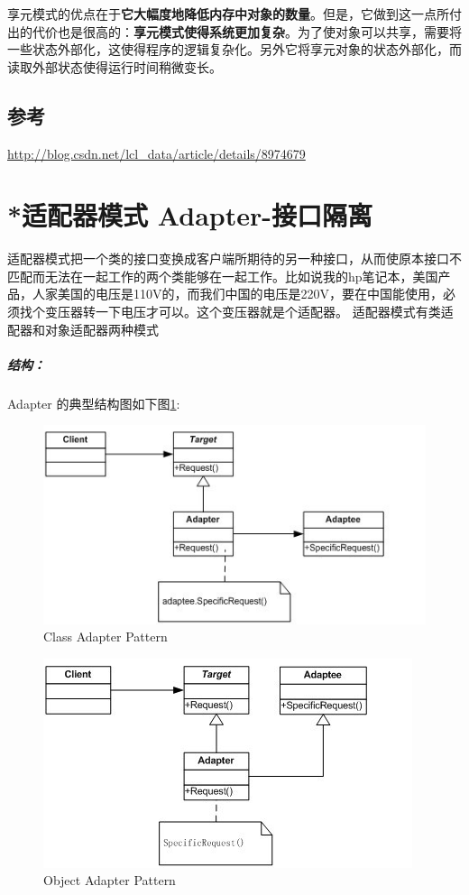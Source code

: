 \documentclass[UTF8,a4paper,12pt]{ctexbook}
\begin{document}
		享元模式的优点在于\textbf{它大幅度地降低内存中对象的数量}。但是，它做到这一点所付出的代价也是很高的：\textbf{享元模式使得系统更加复杂}。为了使对象可以共享，需要将一些状态外部化，这使得程序的逻辑复杂化。另外它将享元对象的状态外部化，而读取外部状态使得运行时间稍微变长。
		
	\subsection{参考}
		\url{http://blog.csdn.net/lcl_data/article/details/8974679}

\newpage
\section{*适配器模式 Adapter-接口隔离}
	适配器模式把一个类的接口变换成客户端所期待的另一种接口，从而使原本接口不匹配而无法在一起工作的两个类能够在一起工作。比如说我的hp笔记本，美国产品，人家美国的电压是110V的，而我们中国的电压是220V，要在中国能使用，必须找个变压器转一下电压才可以。这个变压器就是个适配器。
	适配器模式有类适配器和对象适配器两种模式
	
	\subparagraph{结构：}Adapter 的典型结构图如下图\ref{Adapter}:
	\begin{figure}[h]
		\centering
		\includegraphics[scale= 1]{Adapter1.png}
		\caption{Class Adapter Pattern}
		\label{Adapter}
	\end{figure}
	
	\begin{figure}[h]
		\centering
		\includegraphics[scale= 1]{Adapter2.png}
		\caption{Object Adapter Pattern}
		\label{Adapter2}
	\end{figure}
	
\end{document}
